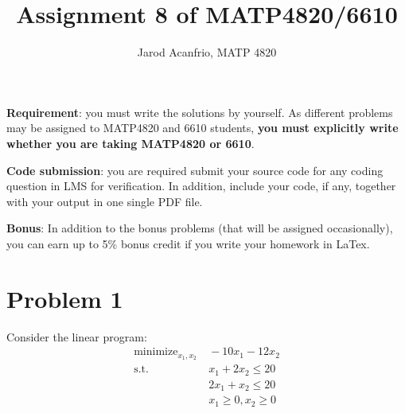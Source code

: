 \documentclass[12pt]{article}
\title{Assignment 8 of MATP4820/6610 }
\author{Jarod Acanfrio, MATP 4820}
\date{}
\newcommand{\st}{{\text{s.t.}}} %
\DeclareMathOperator*{\Min}{minimize}
\begin{document}

\maketitle

\noindent\textbf{Requirement}: you must write the solutions by yourself. As different problems may be assigned to MATP4820 and 6610 students, \textbf{you must explicitly write whether you are taking MATP4820 or 6610}. 

\vspace{0.2cm}

\noindent\textbf{Code submission}: you are required submit your source code for any coding question in LMS for verification. In addition, include your code, if any, together with your output in one single PDF file.   

\vspace{0.2cm}

\noindent\textbf{Bonus}: In addition to the bonus problems (that will be assigned occasionally), you can earn up to 5\% bonus credit if you write your homework in LaTex. 

\section*{Problem 1}
Consider the linear program:
\begin{equation}\label{eq:lp}
\begin{aligned}
\Min_{x_1,x_2} &~ -10x_1-12x_2\\
\st &~ x_1+2x_2 \le 20\\
&~2x_1+x_2\le 20\\
&~ x_1\ge0, x_2\ge 0
\end{aligned}
\end{equation}
\end{document}
